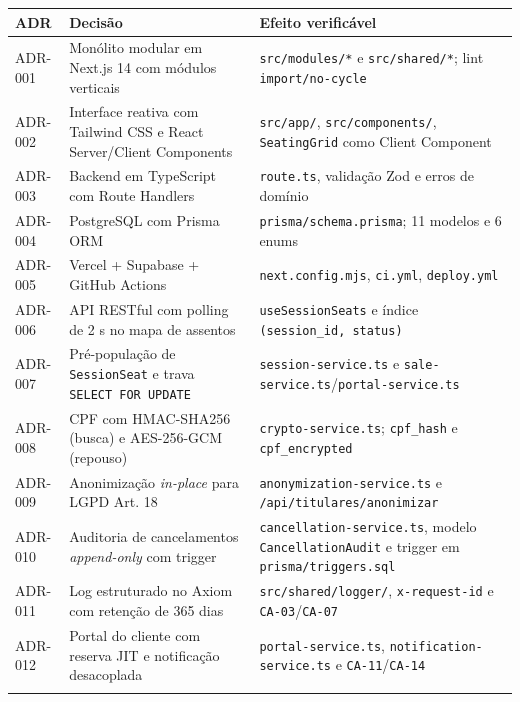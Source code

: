 {\footnotesize
\begin{tabularx}{\textwidth}{>{\fontSemiBold\color{BrandNavy}\centering\arraybackslash}m{1.52cm} >{\hsize=0.968\hsize\sloppy\arraybackslash}X >{\hsize=1.032\hsize\sloppy\arraybackslash}X}
\arrayrulecolor{GithubTableBorder}\toprule
\rowcolor{BrandTableHeader}
\textbf{ADR} & \textbf{Decisão} & \textbf{Efeito verificável} \\
\midrule
\arrayrulecolor{BrandGrayRule}
ADR-001 & Monólito modular em Next.js 14 com módulos verticais & \texttt{src/\allowbreak{}modules/\allowbreak{}*} e \texttt{src/shared/*}; lint \texttt{import/\allowbreak{}no-cycle} \\
\midrule
ADR-002 & Interface reativa com Tailwind CSS e React Server/Client Components & \texttt{src/app/}, \texttt{src/\allowbreak{}components/}, \texttt{SeatingGrid} como Client Component \\
\midrule
ADR-003 & Backend em TypeScript com Route Handlers & 31 \texttt{route.ts}, validação Zod e erros de domínio \\
\midrule
ADR-004 & PostgreSQL com Prisma ORM & \texttt{prisma/\allowbreak{}schema.\allowbreak{}prisma}; 11 modelos e 6 enums \\
\midrule
ADR-005 & Vercel + Supabase + GitHub Actions & \texttt{next.config.mjs}, \texttt{ci.yml}, \texttt{deploy.yml} \\
\midrule
ADR-006 & API RESTful com polling de 2 s no mapa de assentos & \texttt{useSessionSeats} e índice \texttt{(session\_\allowbreak{}id,\allowbreak{}\ status)} \\
\midrule
ADR-007 & Pré-população de \texttt{SessionSeat} e trava \texttt{SELECT\ FOR\ UPDATE} & \texttt{session-\allowbreak{}service.\allowbreak{}ts} e \texttt{sale-service.ts}/\texttt{portal-\allowbreak{}service.\allowbreak{}ts} \\
\midrule
ADR-008 & CPF com HMAC-SHA256 (busca) e AES-256-GCM (repouso) & \texttt{crypto-\allowbreak{}service.\allowbreak{}ts}; \texttt{cpf\_hash} e \texttt{cpf\_\allowbreak{}encrypted} \\
\midrule
ADR-009 & Anonimização \emph{in-place} para LGPD Art. 18 & \texttt{anonymization-\allowbreak{}service.\allowbreak{}ts} e \texttt{/\allowbreak{}api/\allowbreak{}titulares/\allowbreak{}anonimizar} \\
\midrule
ADR-010 & Auditoria de cancelamentos \emph{append-only} com trigger & \texttt{cancellation-\allowbreak{}service.\allowbreak{}ts}, modelo \texttt{CancellationAudit} e trigger em \texttt{prisma/\allowbreak{}triggers.\allowbreak{}sql} \\
\midrule
ADR-011 & Log estruturado no Axiom com retenção de 365 dias & \texttt{src/\allowbreak{}shared/\allowbreak{}logger/}, \texttt{x-request-id} e \texttt{CA-03}/\texttt{CA-07} \\
\midrule
ADR-012 & Portal do cliente com reserva JIT e notificação desacoplada & \texttt{portal-\allowbreak{}service.\allowbreak{}ts}, \texttt{notification-\allowbreak{}service.\allowbreak{}ts} e \texttt{CA-11}/\texttt{CA-14} \\
\arrayrulecolor{GithubTableBorder}\bottomrule
\end{tabularx}%
}
